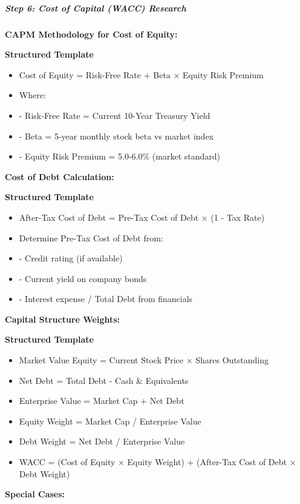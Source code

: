 \documentclass[11pt]{article}
\begin{document}
\subparagraph{Step 6: Cost of Capital (WACC) Research}\mbox{}\par

\textbf{CAPM Methodology for Cost of Equity:}


\textbf{Structured Template}
\begin{itemize}[leftmargin=*,itemsep=2pt,topsep=2pt]
\item {} Cost of Equity = Risk-Free Rate + Beta × Equity Risk Premium
\item {} Where:
\item {} - Risk-Free Rate = Current 10-Year Treasury Yield
\item {} - Beta = 5-year monthly stock beta vs market index
\item {} - Equity Risk Premium = 5.0-6.0\% (market standard)
\end{itemize}

\textbf{Cost of Debt Calculation:}


\textbf{Structured Template}
\begin{itemize}[leftmargin=*,itemsep=2pt,topsep=2pt]
\item {} After-Tax Cost of Debt = Pre-Tax Cost of Debt × (1 - Tax Rate)
\item {} Determine Pre-Tax Cost of Debt from:
\item {} - Credit rating (if available)
\item {} - Current yield on company bonds
\item {} - Interest expense / Total Debt from financials
\end{itemize}

\textbf{Capital Structure Weights:}


\textbf{Structured Template}
\begin{itemize}[leftmargin=*,itemsep=2pt,topsep=2pt]
\item {} Market Value Equity = Current Stock Price × Shares Outstanding
\item {} Net Debt = Total Debt - Cash \& Equivalents
\item {} Enterprise Value = Market Cap + Net Debt
\item {} Equity Weight = Market Cap / Enterprise Value
\item {} Debt Weight = Net Debt / Enterprise Value
\item {} WACC = (Cost of Equity × Equity Weight) + (After-Tax Cost of Debt × Debt Weight)
\end{itemize}

\textbf{Special Cases:}
\end{document}
